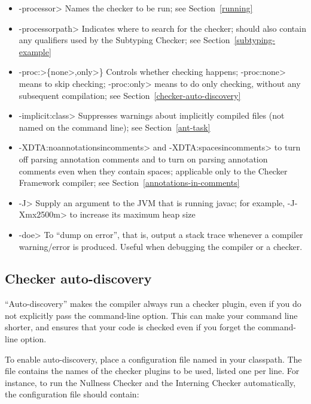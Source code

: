 \begin{itemize}
\item \<-processor> Names the checker to be
  run; see Section~\ref{running}
\item \<-processorpath> Indicates where to search for the
  checker; should also contain any qualifiers used by the Subtyping
  Checker; see Section~\ref{subtyping-example}
\item \<-proc:>\{\<none>,\<only>\} Controls whether checking
  happens; \<-proc:none>
  means to skip checking; \<-proc:only> means to do only
  checking, without any subsequent compilation; see
  Section~\ref{checker-auto-discovery}
\item \<-implicit:class> Suppresses warnings about implicitly compiled files
  (not named on the command line); see Section~\ref{ant-task}
\item \<-XDTA:noannotationsincomments> and \<-XDTA:spacesincomments>
  to turn off parsing annotation comments and
  to turn on parsing annotation comments even when they
  contain spaces; applicable only to the Checker Framework compiler;
  see Section~\ref{annotations-in-comments}
\item \<-J> Supply an argument to the JVM that is running javac;
  for example, \<-J-Xmx2500m> to increase its maximum heap size
\item \<-doe> To ``dump on error'', that is, output a stack trace
  whenever a compiler warning/error is produced. Useful when debugging
  the compiler or a checker.
\end{itemize}


\subsection{Checker auto-discovery\label{checker-auto-discovery}}

``Auto-discovery'' makes the  compiler always run a checker
plugin, even if you do not explicitly pass the 
command-line option.  This can make your command line shorter, and ensures
that your code is checked even if you forget the command-line option.

\begin{sloppypar}
To enable auto-discovery, place a configuration file named
in your classpath.  The file contains the names of the checker plugins to
be used, listed one per line.  For instance, to run the Nullness Checker and the
Interning Checker automatically, the configuration file should contain:
\end{sloppypar}

